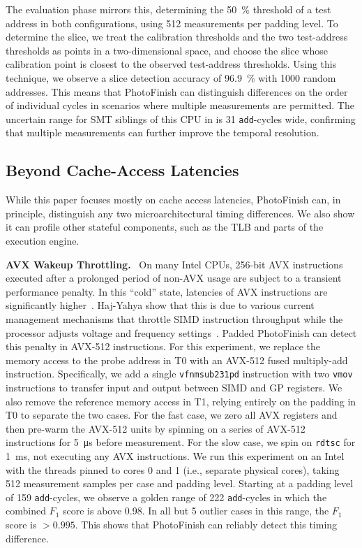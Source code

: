 \documentclass[letterpaper,twocolumn,10pt]{article} %
\newcommand{\paragrabf}[1]{\noindent \textbf{#1.}\ }
\newcommand{\AttackName}{PhotoFinish\xspace}
\newcommand{\tprobe}{{\fontfamily{cmtt}\selectfont T0}\xspace}
\newcommand{\tref}{{\fontfamily{cmtt}\selectfont T1}\xspace}
\begin{document}
The evaluation phase mirrors this, determining the \SI{50}{\percent} threshold of a test address in both configurations, using \num{512} measurements per padding level.
To determine the slice, we treat the calibration thresholds and the two test-address thresholds as points in a two-dimensional space, and choose the slice whose calibration point is closest to the observed test-address thresholds.
Using this technique, we observe a slice detection accuracy of \SI{96.9}{\percent} with \num{1000} random addresses.
This means that \AttackName can distinguish differences on the order of individual cycles in scenarios where multiple measurements are permitted.
The uncertain range for SMT siblings of this CPU in  is \num{31} \texttt{add}-cycles wide, confirming that multiple measurements can further improve the temporal resolution.

\subsection{Beyond Cache-Access Latencies}\label{subsec:other-latency-types}

While this paper focuses mostly on cache access latencies, \AttackName can, in principle, distinguish any two microarchitectural timing differences.
We also show it can profile other stateful components, such as the TLB and parts of the execution engine.

\paragrabf{AVX Wakeup Throttling}
On many Intel CPUs, 256-bit AVX instructions executed after a prolonged period of non-AVX usage are subject to a transient performance penalty.
In this ``cold'' state, latencies of AVX instructions are significantly higher~\cite{Schwarz2019netspectre}.
Haj-Yahya \etal show that this is due to various current management mechanisms that throttle SIMD instruction throughput while the processor adjusts voltage and frequency settings~\cite{haj2021ichannels}.
Padded \AttackName can detect this penalty in AVX-512 instructions.
For this experiment, we replace the memory access to the probe address in \tprobe with an AVX-512 fused multiply-add instruction.
Specifically, we add a single \texttt{vfnmsub231pd} instruction with two \texttt{vmov} instructions to transfer input and output between SIMD and GP registers.
We also remove the reference memory access in \tref, relying entirely on the padding in \tprobe to separate the two cases.
For the fast case, we zero all AVX registers and then pre-warm the AVX-512 units by spinning on a series of AVX-512 instructions for \SI{5}{\micro\second} before measurement.
For the slow case, we spin on \texttt{rdtsc} for \SI{1}{\milli\second}, not executing any AVX instructions.
We run this experiment on an Intel \labeightynineCPU with the threads pinned to cores 0 and 1 (i.e., separate physical cores), taking \num{512} measurement samples per case and padding level.
Starting at a padding level of \num{159} \texttt{add}-cycles, we observe a golden range of \num{222} \texttt{add}-cycles in which the combined $F_1$ score is above \num{0.98}.
In all but \num{5} outlier cases in this range, the $F_1$ score is $> 0.995$.
This shows that \AttackName can reliably detect this timing difference.
\end{document}
